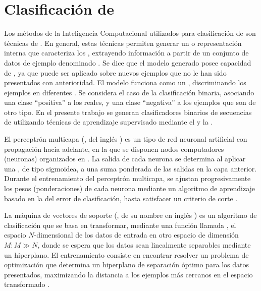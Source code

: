 %
%
%
\section{Clasificación de }
%
Los métodos de la Inteligencia Computacional utilizados para
clasificación de  son técnicas de .
En general, estas técnicas permiten generar un  o
representación interna que caracteriza los , extrayendo
información a partir de un conjunto de datos de ejemplo denominado
.
Se dice que el modelo generado posee capacidad de ,
ya que puede ser aplicado sobre nuevos ejemplos que no le han sido
presentados con anterioridad.
El modelo funciona como un , discriminando los
ejemplos en diferentes .
Se considera el caso de la clasificación binaria, asociando una clase
``positiva'' a los  reales, y una clase ``negativa'' a los
ejemplos que son de otro tipo.
En el presente trabajo se generan clasificadores binarios de
secuencias de  utilizando técnicas de aprendizaje
supervisado mediante el  \cite{mlp1,mlp2} y la
 \cite{svm}.

El perceptrón multicapa (, del inglés ) es un tipo de red neuronal artificial con propagación
hacia adelante, en la que se disponen nodos computadores (neuronas)
organizados en .
La salida de cada neurona se determina al aplicar una , de tipo sigmoidea, a una suma ponderada de las salidas
en la capa anterior.
Durante el entrenamiento del perceptrón multicapa, se ajustan
progresivamente los pesos (ponderaciones) de cada neurona mediante un
algoritmo de aprendizaje basado en la  del
error de clasificación, hasta satisfacer un criterio de corte
\cite{jain}.

La máquina de vectores de soporte (, de su nombre en inglés
) es un algoritmo de clasificación que se
basa en transformar, mediante una función llamada , el
espacio $N$-dimensional de los datos de entrada en otro espacio de
dimensión $M: M\gg N$, donde se espera que los datos sean linealmente
separables mediante un hiperplano.
El entrenamiento consiste en encontrar resolver un problema de
optimización que determina un hiperplano de separación óptimo para los
datos presentados, maximizando la distancia a los ejemplos más
cercanos en el espacio transformado \cite{bottou}.
